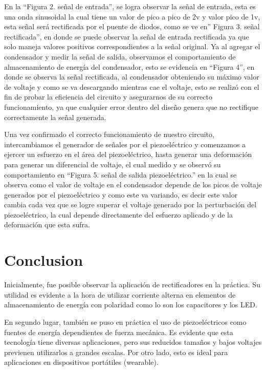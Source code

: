 \documentclass[journal,transmag]{IEEEtran}
\begin{document}
En la “Figura 2. señal de entrada”, se logra observar la señal de entrada, esta es una onda sinusoidal la cual tiene un valor de pico a pico de 2v y valor pico de 1v, esta señal será rectificada por el puente de diodos, como se ve en” Figura 3. señal rectificada”, en donde se puede observar la señal de entrada rectificada ya que solo maneja valores positivos correspondientes a la señal original. Ya al agregar el condensador y medir la señal de salida, observamos el comportamiento de almacenamiento de energía del condensador, esto se evidencia en “Figura 4”, en donde se observa la señal rectificada, al condensador obteniendo su máximo valor de voltaje y como se va descargando mientras cae el voltaje, esto se realizó con el fin de probar la eficiencia del circuito y asegurarnos de su correcto funcionamiento, ya que cualquier error dentro del diseño genera que no rectifique correctamente la señal generada. 

Una vez confirmado el correcto funcionamiento de nuestro circuito, intercambiamos el generador de señales por el piezoeléctrico y comenzamos a ejercer un esfuerzo en el área del piezoeléctrico, hasta generar una deformación para generar un diferencial de voltaje, el cual medido y se observó su comportamiento en “Figura 5. señal de salida piezoeléctrico.” en la cual se observa como el valor de voltaje en el condensador depende de los picos de voltaje generados por el piezoeléctrico y como este va variando, es decir este valor cambia cada vez que se logre superar el voltaje generado por la perturbación del piezoeléctrico, la cual depende directamente del esfuerzo aplicado y de la deformación que esta sufra. 


\section{Conclusion}
	
	Inicialmente, fue posible observar la aplicación de rectificadores en la práctica. Su utilidad es evidente a la hora de utilizar corriente alterna en elementos de almacenamiento de energía con polaridad como lo son los capacitores y los LED. 

En segundo lugar, también se puso en práctica el uso de piezoeléctricos como fuentes de energía dependientes de fuerza mecánica. Es evidente que esta tecnología tiene diversas aplicaciones, pero sus reducidos tamaños y bajos voltajes previenen utilizarlos a grandes escalas. Por otro lado, esto es ideal para aplicaciones en dispositivos portátiles (wearable). 
\end{document}
